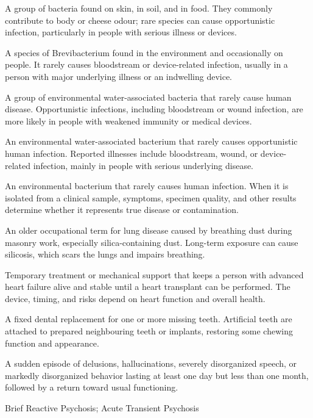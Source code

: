  A group of bacteria found on skin, in soil, and in food. They commonly contribute to body or cheese odour; rare species can cause opportunistic infection, particularly in people with serious illness or devices.

 A species of Brevibacterium found in the environment and occasionally on people. It rarely causes bloodstream or device-related infection, usually in a person with major underlying illness or an indwelling device.

 A group of environmental water-associated bacteria that rarely cause human disease. Opportunistic infections, including bloodstream or wound infection, are more likely in people with weakened immunity or medical devices.

 An environmental water-associated bacterium that rarely causes opportunistic human infection. Reported illnesses include bloodstream, wound, or device-related infection, mainly in people with serious underlying disease.

 An environmental bacterium that rarely causes human infection. When it is isolated from a clinical sample, symptoms, specimen quality, and other results determine whether it represents true disease or contamination.

 An older occupational term for lung disease caused by breathing dust during masonry work, especially silica-containing dust. Long-term exposure can cause silicosis, which scars the lungs and impairs breathing.

 Temporary treatment or mechanical support that keeps a person with advanced heart failure alive and stable until a heart transplant can be performed. The device, timing, and risks depend on heart function and overall health.

 A fixed dental replacement for one or more missing teeth. Artificial teeth are attached to prepared neighbouring teeth or implants, restoring some chewing function and appearance.

 A sudden episode of delusions, hallucinations, severely disorganized speech, or markedly disorganized behavior lasting at least one day but less than one month, followed by a return toward usual functioning.

\synonyms
Brief Reactive Psychosis; Acute Transient Psychosis

